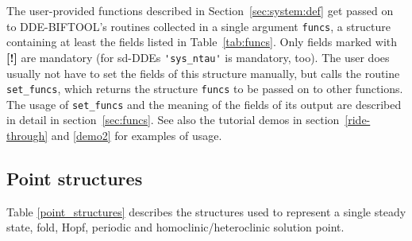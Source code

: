 \documentclass[10pt]{scrartcl}
\newcommand{\DDEBIFCODE}{\textsc{DDE-BIFTOOL}}
\newcommand{\blist}[1]{\mbox{\lstinline!#1!}}
\begin{document}
The user-provided functions described in Section~\ref{sec:system:def}
get passed on to \DDEBIFCODE's routines collected in a single argument
\blist{funcs}, a structure containing at least the fields listed in
Table~\ref{tab:funcs}. Only fields marked with \textbf{[!]} are
mandatory (for sd-DDEs \blist{'sys_ntau'} is mandatory, too). The user
does usually not have to set the fields of this structure manually,
but calls the routine \blist{set_funcs}, which returns the structure
\blist{funcs} to be passed on to other functions. The usage of
\blist{set_funcs} and the meaning of the fields of its output are
described in detail in section~\ref{sec:funcs}. See also the tutorial
demos in section~\ref{ride-through} and \ref{demo2} for examples of
usage.

\subsection{Point structures}\label{sec:point:struct}

Table \ref{point_structures} describes the structures used to
represent a single steady state, fold, Hopf, 
periodic and 
homoclinic/heteroclinic solution point.
\end{document}
